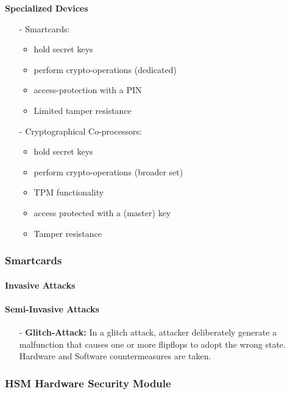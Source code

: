 \textbf{Specialized Devices}
\begin{itemize}
    \item[-]Smartcards: 
    \begin{itemize}
        \item hold secret keys
        \item perform crypto-operations (dedicated)
        \item access-protection with a PIN
        \item Limited tamper resistance
    \end{itemize}
    \item[-]Cryptographical Co-processors:
    \begin{itemize}
        \item hold secret keys
        \item perform crypto-operations (broader set)
        \item TPM functionality
        \item access protected with a (master) key
        \item Tamper resistance
    \end{itemize}{}
    
\end{itemize}{}

\subsubsection{Smartcards}

\paragraph{Invasive Attacks}

\paragraph{Semi-Invasive Attacks}
\begin{itemize}
    \item[-]\textbf{Glitch-Attack: }In a glitch attack, attacker deliberately generate a malfunction that
    causes one or more flipflops to adopt the wrong state.
    Hardware and Software countermeasures are taken.
\end{itemize}{}

\subsubsection{HSM Hardware Security Module}
